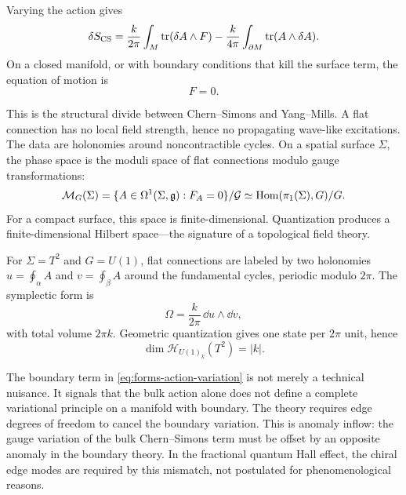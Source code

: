 Varying the action gives
\begin{equation}
  \delta S_{\operatorname{CS}}
  =
  \frac{k}{2\pi}\int_M\operatorname{tr}(\delta A\wedge F)
  -
  \frac{k}{4\pi}\int_{\partial M}\operatorname{tr}(A\wedge\delta A).
  \label{eq:forms-action-variation}
\end{equation}
On a closed manifold, or with boundary conditions that kill the surface term, the equation of motion is
\begin{equation}
  F=0.
  \label{eq:forms-flat-eom}
\end{equation}

This is the structural divide between Chern--Simons and Yang--Mills. A flat connection has no local field strength, hence no propagating wave-like excitations. The data are holonomies around noncontractible cycles. On a spatial surface $\Sigma$, the phase space is the moduli space of flat connections modulo gauge transformations:
\begin{equation}
  \mathcal M_G(\Sigma)
  =
  \{A\in\Omega^1(\Sigma,\mathfrak g):F_A=0\}/\mathcal G
  \simeq
  \operatorname{Hom}(\pi_1(\Sigma),G)/G.
  \label{eq:forms-flat-moduli}
\end{equation}
For a compact surface, this space is finite-dimensional. Quantization produces a finite-dimensional Hilbert space—the signature of a topological field theory.

For $\Sigma=T^2$ and $G=U(1)$, flat connections are labeled by two holonomies $u=\oint_\alpha A$ and $v=\oint_\beta A$ around the fundamental cycles, periodic modulo $2\pi$. The symplectic form is
\begin{equation}
  \Omega
  =
  \frac{k}{2\pi}\,\dd u\wedge\dd v,
  \label{eq:forms-symplectic-torus}
\end{equation}
with total volume $2\pi k$. Geometric quantization gives one state per $2\pi$ unit, hence
\begin{equation}
  \dim\mathcal H_{U(1)_k}(T^2)=|k|.
  \label{eq:forms-u1-dim}
\end{equation}

The boundary term in \eqref{eq:forms-action-variation} is not merely a technical nuisance. It signals that the bulk action alone does not define a complete variational principle on a manifold with boundary. The theory requires edge degrees of freedom to cancel the boundary variation. This is anomaly inflow: the gauge variation of the bulk Chern--Simons term must be offset by an opposite anomaly in the boundary theory. In the fractional quantum Hall effect, the chiral edge modes are required by this mismatch, not postulated for phenomenological reasons.

